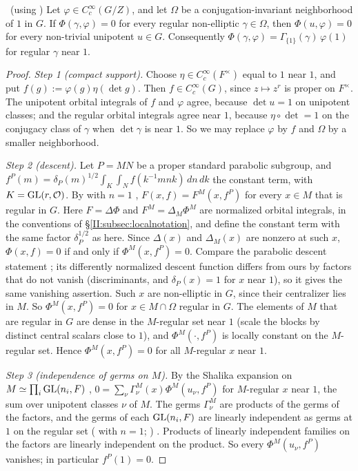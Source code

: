 \begin{lemma}\label{II:lem:cuspnear1}\ (using \Ev)
Let $\varphi\in C_c^\infty(G/Z)$, and let $\Omega$ be a conjugation-invariant neighborhood of $1$ in $G$. If $\Phi(\gamma,\varphi)=0$ for every regular non-elliptic $\gamma\in\Omega$, then $\Phi(u,\varphi)=0$ for every non-trivial unipotent $u\in G$. Consequently $\Phi(\gamma,\varphi)=\Gamma_{\{1\}}(\gamma)\,\varphi(1)$ for regular $\gamma$ near $1$.
\end{lemma}
\begin{proof}
\emph{Step 1 (compact support).} Choose $\eta\in C_c^\infty(F^\times)$ equal to $1$ near $1$, and put $f(g):=\varphi(g)\eta(\det g)$. Then $f\in C_c^\infty(G)$, since $z\mapsto z^r$ is proper on $F^\times$. The unipotent orbital integrals of $f$ and $\varphi$ agree, because $\det u=1$ on unipotent classes; and the regular orbital integrals agree near $1$, because $\eta\circ\det=1$ on the conjugacy class of $\gamma$ when $\det\gamma$ is near $1$. So we may replace $\varphi$ by $f$ and $\Omega$ by a smaller neighborhood.

\emph{Step 2 (descent).} Let $P=MN$ be a proper standard parabolic subgroup, and $f^P(m)=\delta_P(m)^{1/2}\int_K\int_Nf(k^{-1}mnk)\,dn\,dk$ the constant term, with $K=\mathrm{GL}(r,\mathcal{O})$. By \cite[\S7, Proposition]{FK86} with $n=1$ \Ev, $F(x,f)=F^M(x,f^P)$ for every $x\in M$ that is regular in $G$. Here $F=\Delta\Phi$ and $F^M=\Delta_M\Phi^M$ are normalized orbital integrals, in the conventions of \S\ref{II:subsec:localnotation}, and \cite{FK86} define the constant term with the same factor $\delta_P^{1/2}$ as here. Since $\Delta(x)$ and $\Delta_M(x)$ are nonzero at such $x$, $\Phi(x,f)=0$ if and only if $\Phi^M(x,f^P)=0$. Compare the parabolic descent statement \cite[Proposition~2.39]{KT26}; its differently normalized descent function differs from ours by factors that do not vanish (discriminants, and $\delta_P(x)=1$ for $x$ near $1$), so it gives the same vanishing assertion. Such $x$ are non-elliptic in $G$, since their centralizer lies in $M$. So $\Phi^M(x,f^P)=0$ for $x\in M\cap\Omega$ regular in $G$. The elements of $M$ that are regular in $G$ are dense in the $M$-regular set near $1$ (scale the blocks by distinct central scalars close to $1$), and $\Phi^M(\cdot,f^P)$ is locally constant on the $M$-regular set. Hence $\Phi^M(x,f^P)=0$ for all $M$-regular $x$ near $1$.

\emph{Step 3 (independence of germs on $M$).} By the Shalika expansion on $M\simeq\prod_i\mathrm{GL}(n_i,F)$ \cite{Sha72} \Ev, $0=\sum_\nu\Gamma^M_\nu(x)\Phi^M(u_\nu,f^P)$ for $M$-regular $x$ near $1$, the sum over unipotent classes $\nu$ of $M$. The germs $\Gamma^M_\nu$ are products of the germs of the factors, and the germs of each $\mathrm{GL}(n_i,F)$ are linearly independent as germs at $1$ on the regular set (\cite[Proposition~1.6]{KP86} with $n=1$; \cite[Lemma~24]{HC78}) \Ev. Products of linearly independent families on the factors are linearly independent on the product. So every $\Phi^M(u_\nu,f^P)$ vanishes; in particular $f^P(1)=0$.


\end{proof}
